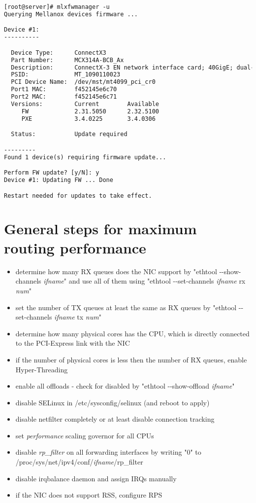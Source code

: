 \begin{lstlisting}[language=TeX,label={lst:setup-firmware-update},caption={Firmware update procedure}]
[root@server]# mlxfwmanager -u
Querying Mellanox devices firmware ...

Device #1:
----------

  Device Type:      ConnectX3
  Part Number:      MCX314A-BCB_Ax
  Description:      ConnectX-3 EN network interface card; 40GigE; dual-port QSFP; PCIe3.0 x8 8GT/s; RoHS R6
  PSID:             MT_1090110023
  PCI Device Name:  /dev/mst/mt4099_pci_cr0
  Port1 MAC:        f452145e6c70
  Port2 MAC:        f452145e6c71
  Versions:         Current        Available     
     FW             2.31.5050      2.32.5100     
     PXE            3.4.0225       3.4.0306      

  Status:           Update required

---------
Found 1 device(s) requiring firmware update...

Perform FW update? [y/N]: y
Device #1: Updating FW ... Done

Restart needed for updates to take effect.
\end{lstlisting}

\chapter{General steps for maximum routing performance}\label{app:general-steps}
\begin{itemize}
\item determine how many RX queues does the NIC support by "ethtool -{}-show-channels {\it{ifname}}" and use all of them using
"ethtool -{}-set-channels {\it{ifname}} rx {\it{num}}"
\item set the number of TX queues at least the same as RX queues by "ethtool -{}-set-channels {\it{ifname}} tx {\it{num}}"
\item determine how many physical cores has the CPU, which is directly connected to the PCI-Express link with the NIC
\item if the number of physical cores is less then the number of RX queues, enable Hyper-Threading
\item enable all offloads - check for disabled by "ethtool -{}-show-offload {\it{ifname}}"
\item disable SELinux in /etc/sysconfig/selinux (and reboot to apply)
\item disable netfilter completely or at least disable connection tracking
\item set {\it{performance}} scaling governor for all CPUs
\item disable {\it{rp\_filter}} on all forwarding interfaces by writing "0" to /proc/sys/net/ipv4/conf/{\it{ifname}}/rp\_filter
\item disable irqbalance daemon and assign IRQs manually
\item if the NIC does not support RSS, configure RPS
\end{itemize}
